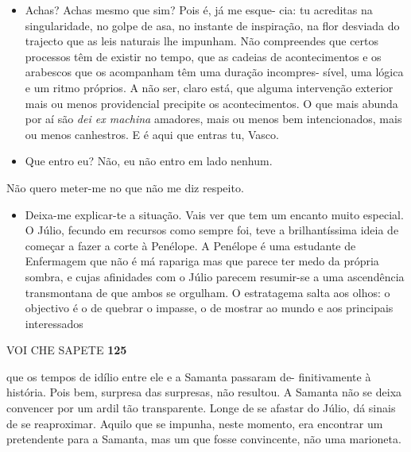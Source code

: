 \begin{itemize}
\tightlist
\item
  Achas? Achas mesmo que sim? Pois é, já me esque- cia: tu acreditas na
  singularidade, no golpe de asa, no instante de inspiração, na flor
  desviada do trajecto que as leis naturais lhe impunham. Não
  compreendes que certos processos têm de existir no tempo, que as
  cadeias de acontecimentos e os arabescos que os acompanham têm uma
  duração incompres- sível, uma lógica e um ritmo próprios. A não ser,
  claro está, que alguma intervenção exterior mais ou menos providencial
  precipite os acontecimentos. O que mais abunda por aí são \emph{dei ex
  machina }amadores, mais ou menos bem intencionados, mais ou menos
  canhestros. E é aqui que entras tu, Vasco.
\item
  Que entro eu? Não, eu não entro em lado nenhum.
\end{itemize}

Não quero meter-me no que não me diz respeito.

\begin{itemize}
\tightlist
\item
  Deixa-me explicar-te a situação. Vais ver que tem um encanto muito
  especial. O Júlio, fecundo em recursos como sempre foi, teve a
  brilhantíssima ideia de começar a fazer a corte à Penélope. A Penélope
  é uma estudante de Enfermagem que não é má rapariga mas que parece ter
  medo da própria sombra, e cujas afinidades com o Júlio parecem
  resumir-se a uma ascendência transmontana de que ambos se orgulham. O
  estratagema salta aos olhos: o objectivo é o de quebrar o impasse, o
  de mostrar ao mundo e aos principais interessados
\end{itemize}

VOI CHE SAPETE \textbf{125}

que os tempos de idílio entre ele e a Samanta passaram de- finitivamente
à história. Pois bem, surpresa das surpresas, não resultou. A Samanta
não se deixa convencer por um ardil tão transparente. Longe de se
afastar do Júlio, dá sinais de se reaproximar. Aquilo que se impunha,
neste momento, era encontrar um pretendente para a Samanta, mas um que
fosse convincente, não uma marioneta.

